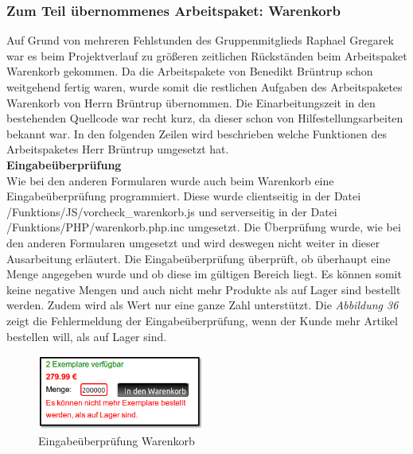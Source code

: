 \subsubsection{Zum Teil übernommenes Arbeitspaket: Warenkorb}
Auf Grund von mehreren Fehlstunden des Gruppenmitglieds Raphael Gregarek war es beim Projektverlauf zu größeren zeitlichen Rückständen beim Arbeitspaket \glqq Warenkorb\grqq{} gekommen. Da die Arbeitspakete von Benedikt Brüntrup schon weitgehend fertig waren, wurde somit die restlichen Aufgaben des Arbeitspaketes \glqq Warenkorb\grqq{} von Herrn Brüntrup übernommen. Die Einarbeitungszeit in den bestehenden Quellcode war recht kurz, da dieser schon von Hilfestellungsarbeiten bekannt war. In den folgenden Zeilen wird beschrieben welche Funktionen des Arbeitspaketes Herr Brüntrup umgesetzt hat.\\

\textbf{Eingabeüberprüfung}\\
Wie bei den anderen Formularen wurde auch beim Warenkorb eine Eingabeüberprüfung programmiert. Diese wurde clientseitig in der Datei \glqq /Funktions/JS/vorcheck\_warenkorb.js\grqq{} und serverseitig in der Datei \glqq /Funktions/PHP/warenkorb.php.inc\grqq{} umgesetzt. Die Überprüfung wurde, wie bei den anderen Formularen umgesetzt und wird deswegen nicht weiter in dieser Ausarbeitung erläutert. Die Eingabeüberprüfung überprüft, ob überhaupt eine Menge angegeben wurde und ob diese im gültigen Bereich liegt. Es können somit keine negative Mengen und auch nicht mehr Produkte als auf Lager sind bestellt werden. Zudem wird als Wert nur eine ganze Zahl unterstützt. Die \textit{Abbildung 36} zeigt die Fehlermeldung der Eingabeüberprüfung, wenn der Kunde mehr Artikel bestellen will, als auf Lager sind.\\

\begin{figure}[H]
	\begin{center}
			\includegraphics[width=55mm]{Bilder/warenkorb_eingabepruefung.png}
	\end{center}
	\caption{Eingabeüberprüfung Warenkorb}
\end{figure}

